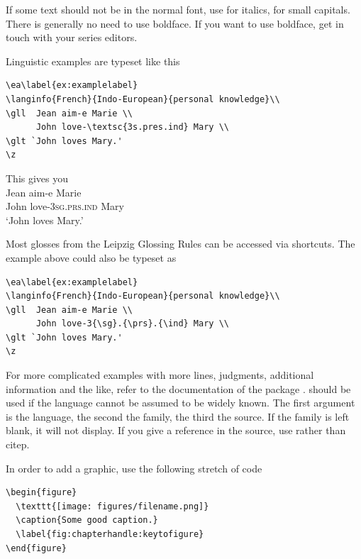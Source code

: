 If some text should not be in the normal font, use 
 for italics, 
 for small capitals. There is generally no need to use boldface. If you want to use boldface, get in touch with your series editors.

Linguistic examples are typeset like this

\begin{verbatim}
\ea\label{ex:examplelabel}
\langinfo{French}{Indo-European}{personal knowledge}\\
\gll  Jean aim-e Marie \\
      John love-\textsc{3s.pres.ind} Mary \\
\glt `John loves Mary.'    
\z
\end{verbatim}

This gives you
\ea\label{ex:examplelabel}
\\
\gll  Jean aim-e Marie \\
      John love-\textsc{3sg.prs.ind} Mary \\
\glt `John loves Mary.'    
\z

Most glosses from the Leipzig Glossing Rules can be accessed via shortcuts. The example above could also be typeset as

\begin{verbatim}
\ea\label{ex:examplelabel}
\langinfo{French}{Indo-European}{personal knowledge}\\
\gll  Jean aim-e Marie \\
      John love-3{\sg}.{\prs}.{\ind} Mary \\
\glt `John loves Mary.'    
\z
\end{verbatim}

For more complicated examples with more lines, judgments, additional information and the like, refer to the documentation of the package .
 should be used if the language cannot be assumed to be widely known. The first argument is the language, the second the family, the third the source. If the family is left blank, it will not display. If you give a reference in the source, use  rather than {{\bs}citep}.

In order to add a graphic, use the following stretch of code

\begin{verbatim}
\begin{figure}
  \texttt{[image: figures/filename.png]}
  \caption{Some good caption.}
  \label{fig:chapterhandle:keytofigure}
\end{figure}
\end{verbatim}

